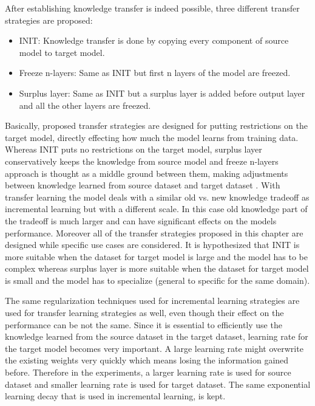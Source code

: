 After establishing knowledge transfer is indeed possible, three different transfer strategies are proposed:

\begin{itemize}

\item INIT: Knowledge transfer is done by copying every component of source model to target model.  

\item Freeze n-layers: Same as INIT but first n layers of the model are freezed.

\item Surplus layer:  Same as INIT but a surplus layer is added before output layer and all the other layers are freezed.

\end{itemize}

Basically, proposed transfer strategies are designed for putting restrictions on the target model, directly effecting how much the model learns from training data. Whereas INIT puts no restrictions on the target model, surplus layer conservatively keeps the knowledge from source model and freeze n-layers approach is thought as a middle ground between them, making adjustments between knowledge learned from source dataset and target dataset . With transfer learning the model deals with a similar old vs. new knowledge tradeoff as incremental learning but with a different scale. In this case old knowledge part of the tradeoff is much larger and can have significant effects on the models performance. Moreover all of the transfer strategies proposed in this chapter are designed while specific use cases are considered. It is hypothesized that INIT is more suitable when the dataset for target model is large and the model has to be complex whereas surplus layer is more suitable when the dataset for target model is small and the model has to specialize (general to specific for the same domain). 

The same regularization techniques used for incremental learning strategies are used for transfer learning strategies as well, even though their effect on the performance can be not the same. Since it is essential to efficiently use the knowledge learned from the source dataset in the target dataset, learning rate for the target model becomes very important. A large learning rate might overwrite the existing weights very quickly which means losing the information gained before. Therefore in the experiments, a larger learning rate is used for source dataset and smaller learning rate is used for target dataset. The same exponential learning decay that is used in incremental learning, is kept.


